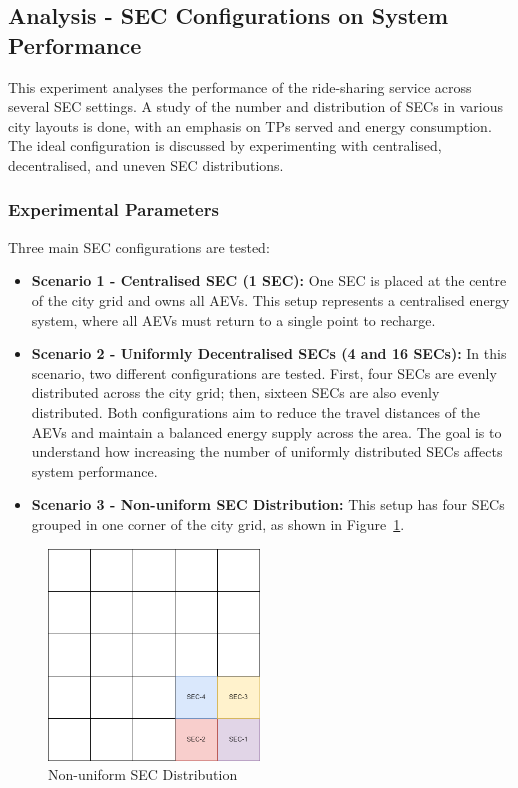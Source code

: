 \subsection{Analysis - SEC Configurations on System Performance}
\label{sec:sec_configurations}

This experiment analyses the performance of the ride-sharing service across several SEC settings. A study of the number and distribution of SECs in various city layouts is done, with an emphasis on TPs served and energy consumption. The ideal configuration is discussed by experimenting with centralised, decentralised, and uneven SEC distributions.

\subsubsection{Experimental Parameters}
Three main SEC configurations are tested:
\begin{itemize}
    \item \textbf{Scenario 1 - Centralised SEC (1 SEC):} One SEC is placed at the centre of the city grid and owns all AEVs. This setup represents a centralised energy system, where all AEVs must return to a single point to recharge.

    \item \textbf{Scenario 2 - Uniformly Decentralised SECs (4 and 16 SECs):} In this scenario, two different configurations are tested. First, four SECs are evenly distributed across the city grid; then, sixteen SECs are also evenly distributed. Both configurations aim to reduce the travel distances of the AEVs and maintain a balanced energy supply across the area. The goal is to understand how increasing the number of uniformly distributed SECs affects system performance.

    \item \textbf{Scenario 3 - Non-uniform SEC Distribution:} This setup has four SECs grouped in one corner of the city grid, as shown in Figure~\ref{fig:non_uniform_sec}. 
\end{itemize}
\begin{figure}[h!]
    \centering
    \includegraphics[width=0.5\textwidth, height=0.3\textheight]{Crest/Images/chapter_3_1_non_uniform_sec.png}
    \caption{Non-uniform SEC Distribution}
    \label{fig:non_uniform_sec}
\end{figure}

